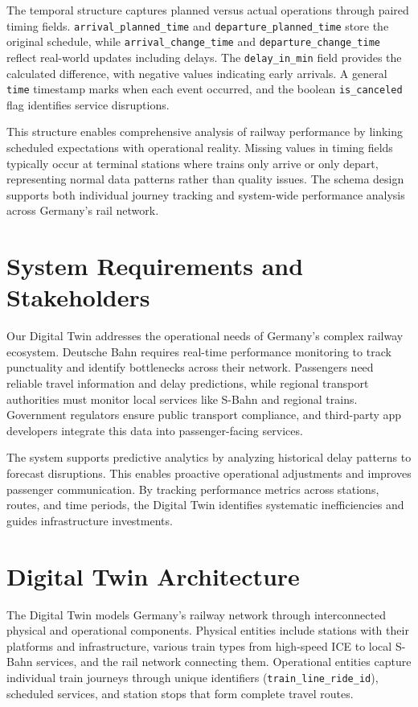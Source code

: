 \documentclass{article}
\begin{document}
The temporal structure captures planned versus actual operations through paired timing fields. \texttt{arrival\_planned\_time} and \texttt{departure\_planned\_time} store the original schedule, while \texttt{arrival\_change\_time} and \texttt{departure\_change\_time} reflect real-world updates including delays. The \texttt{delay\_in\_min} field provides the calculated difference, with negative values indicating early arrivals. A general \texttt{time} timestamp marks when each event occurred, and the boolean \texttt{is\_canceled} flag identifies service disruptions.

This structure enables comprehensive analysis of railway performance by linking scheduled expectations with operational reality. Missing values in timing fields typically occur at terminal stations where trains only arrive or only depart, representing normal data patterns rather than quality issues. The schema design supports both individual journey tracking and system-wide performance analysis across Germany's rail network.

\section{System Requirements and Stakeholders}

Our Digital Twin addresses the operational needs of Germany's complex railway ecosystem. Deutsche Bahn requires real-time performance monitoring to track punctuality and identify bottlenecks across their network. Passengers need reliable travel information and delay predictions, while regional transport authorities must monitor local services like S-Bahn and regional trains. Government regulators ensure public transport compliance, and third-party app developers integrate this data into passenger-facing services.

The system supports predictive analytics by analyzing historical delay patterns to forecast disruptions. This enables proactive operational adjustments and improves passenger communication. By tracking performance metrics across stations, routes, and time periods, the Digital Twin identifies systematic inefficiencies and guides infrastructure investments.

\section{Digital Twin Architecture}

The Digital Twin models Germany's railway network through interconnected physical and operational components. Physical entities include stations with their platforms and infrastructure, various train types from high-speed ICE to local S-Bahn services, and the rail network connecting them. Operational entities capture individual train journeys through unique identifiers (\texttt{train\_line\_ride\_id}), scheduled services, and station stops that form complete travel routes.
\end{document}
